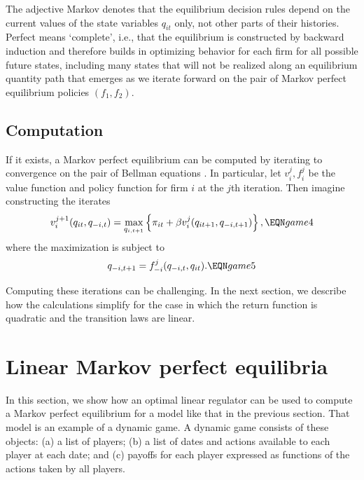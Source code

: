   The adjective Markov denotes that the equilibrium decision
rules depend on the current values of the state variables
$q_{it}$ only, not other parts of their histories.   Perfect means `complete', i.e., that
the equilibrium is constructed by backward induction and therefore
builds in optimizing behavior for each firm for all possible
future states, including many states  that will  not be realized along an equilibrium quantity path that emerges as  we iterate
 forward on the pair of Markov perfect equilibrium
policies $(f_1, f_2)$.

\subsection{Computation}
  If it exists, a Markov perfect equilibrium can be computed
by iterating to convergence on the pair of Bellman equations
.  In particular, let $v_i^j,f_i^j$ be the value function
and policy function for firm $i$ at the $j$th iteration.  Then
imagine constructing the iterates
$$ v_i^{j+1}(q_{it}, q_{-i,t}) = \max_{q_{i,t+1}} \left\{
    \pi_{it} + \beta v_i^{j}(q_{it+1}, q_{-i,t+1}) \right\}, \EQN game4 $$
where the maximization is subject to
$$ q_{-i,t+1} = f^j_{-i}(q_{-i,t}, q_{it}). \EQN game5 $$

  Computing these iterations can be challenging.
In the next section, we describe how
the calculations simplify for the case in which
the return function is quadratic and the transition laws are linear.
\section{Linear Markov perfect equilibria}
In this section, we show how an  optimal linear regulator
can be used to compute  a Markov perfect equilibrium for a model like that in the previous section.
That model is
 an example of a dynamic game.  A dynamic  game consists
of these objects: (a) a list of players; (b) a list of dates and
actions available to each player at each date; and (c) payoffs
for each player expressed as  functions of the actions taken
by all players.


